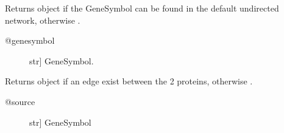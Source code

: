 \documentclass[letterpaper,10pt,english]{sphinxmanual}
\begin{document}
\begin{fulllineitems}
\begin{fulllineitems}
\begin{quote}
\begin{description}
\end{description}\end{quote}

\end{fulllineitems}


\begin{fulllineitems}
\label{\detokenize{main:pypath.main.PyPath.go_enrichment}}
\end{fulllineitems}


\begin{fulllineitems}
\label{\detokenize{main:pypath.main.PyPath.gs}}
Returns  object if the GeneSymbol
can be found in the default undirected network,
otherwise .
\begin{description}
\item[{@genesymbol}] \leavevmode{[}str{]}
GeneSymbol.

\end{description}

\end{fulllineitems}


\begin{fulllineitems}
\label{\detokenize{main:pypath.main.PyPath.gs_affected_by}}
\end{fulllineitems}


\begin{fulllineitems}
\label{\detokenize{main:pypath.main.PyPath.gs_affects}}
\end{fulllineitems}


\begin{fulllineitems}
\label{\detokenize{main:pypath.main.PyPath.gs_edge}}
Returns  object if an edge exist between
the 2 proteins, otherwise .
\begin{description}
\item[{@source}] \leavevmode{[}str{]}
GeneSymbol


\end{description}
\end{fulllineitems}
\end{fulllineitems}
\end{document}

